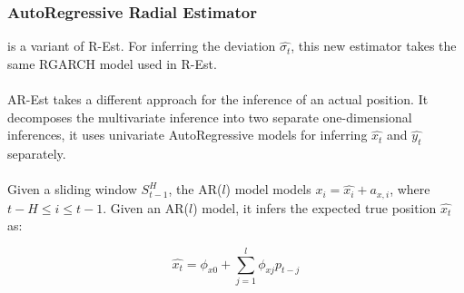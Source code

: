
\begin{frame}
\frametitle{AutoRegressive Radial Estimator}

 is a variant of R-Est. For inferring the deviation $\hat{\sigma_t}$, this new estimator takes the same RGARCH model used in R-Est.\\~\\

AR-Est takes a different approach for the inference of an actual position. It decomposes the multivariate inference into two separate one-dimensional inferences, it uses univariate AutoRegressive models for inferring $\hat{x_t}$ and $\hat{y_t}$ separately.\\~\\

Given a sliding window $S^{H}_{t-1}$, the AR($l$) model models $x_i = \hat{x_i} + a_{x,i}$, where $t-H \leq i \leq t-1$. Given an AR($l$) model, it infers the expected true position $\hat{x_t}$ as:~\cite{shumway2010time}

\begin{equation}
  \hat{x_t} = \phi_{x0} + \sum_{j=1}^{l}\phi_{xj}p_{t-j}
\end{equation}

\end{frame}


